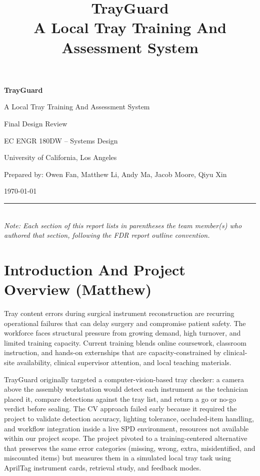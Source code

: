 \documentclass[10pt,a4paper]{article}
\title{TrayGuard\\A Local Tray Training And Assessment System}
\author{}
\date{}
\begin{document}
\begin{titlepage}
\centering
\vspace*{3cm}
{\Huge\bfseries TrayGuard\par}
\vspace{0.5cm}
{\Large A Local Tray Training And Assessment System\par}
\vspace{2cm}
{\large Final Design Review\par}
\vspace{1cm}
{\large EC ENGR 180DW -- Systems Design\par}
\vspace{0.5cm}
{\large University of California, Los Angeles\par}
\vspace{3cm}
{\large Prepared by: Owen Fan, Matthew Li, Andy Ma, Jacob Moore, Qiyu Xin\par}
\vspace{0.3cm}
{\large \today\par}
\vfill
\noindent\rule{\textwidth}{0.4pt}\\
\small{\textit{Note: Each section of this report lists in parentheses the team member(s) who authored that section, following the FDR report outline convention.}}
\end{titlepage}

\tableofcontents
\newpage






\section{Introduction And Project Overview \hfill {\normalfont\small (Matthew)}}
\label{sec:introduction-and-project-overview}
Tray content errors during surgical instrument reconstruction are recurring
operational failures that can delay surgery and compromise patient safety. The
workforce faces structural pressure from growing demand, high turnover, and
limited training capacity. Current training blends online coursework,
classroom instruction, and hands-on externships that are capacity-constrained by
clinical-site availability, clinical supervisor attention, and local
teaching materials.

TrayGuard originally targeted a computer-vision-based tray checker: a camera
above the assembly workstation would detect each instrument as the technician
placed it, compare detections against the tray list, and return a go or no-go
verdict before sealing. The CV approach failed early because it required the
project to validate detection accuracy, lighting tolerance, occluded-item
handling, and workflow integration inside a live SPD environment, resources
not available within our project scope. The project pivoted to a training-centered
alternative that preserves the same error categories (missing, wrong, extra,
misidentified, and miscounted items) but measures them in a simulated local tray
task using AprilTag instrument cards, retrieval study, and feedback modes.
\end{document}
